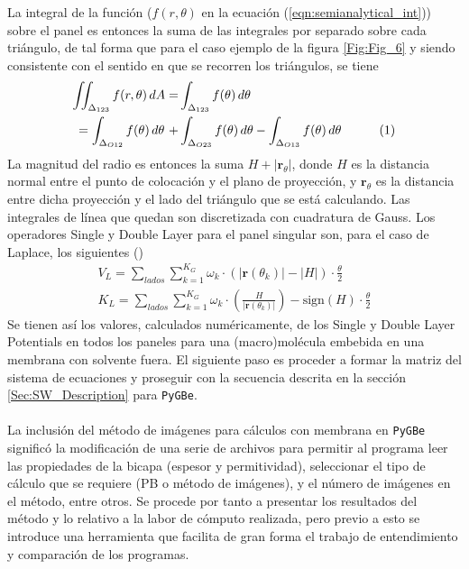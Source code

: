 \documentclass[12pt, twoside, onehalfspace, numbers, spanish]{ezthesis}
\newcommand\numberthis{\addtocounter{equation}{1}\tag{\theequation}}
\numberwithin{equation}{section}
\begin{document}
\noindent
La integral de la función ($f(r,\theta)$ en la ecuación (\ref{eqn:semianalytical_int})) sobre el panel es entonces la suma de las integrales por separado sobre cada triángulo, de tal forma que para el caso ejemplo de la figura \ref{Fig:Fig_6} y siendo consistente con el sentido en que se recorren los triángulos, se tiene
\begin{align*}
\iint_{\Delta_{123}}f(r,\theta)\, dA =& \int_{\Delta_{123}}f(\theta)\, d\theta \\
= \int_{\Delta_{O12}}f(\theta)\, d\theta\, \, + & \int_{\Delta_{O23}}f(\theta)\, d\theta - \int_{\Delta_{O13}}f(\theta)\, d\theta& \numberthis \label{eqn:semianalytical_int}
\end{align*}
La magnitud del radio es entonces la suma $H + |\mathbf{r}_\theta|$, donde $H$ es la distancia normal entre el punto de colocación y el plano de proyección, y $\mathbf{r}_\theta$ es la distancia entre dicha proyección y el lado del triángulo que se está calculando. Las integrales de línea que quedan son discretizada con cuadratura de Gauss. Los operadores Single y Double Layer para el panel singular son, para el caso de Laplace, los siguientes (\cite{Hess})
\begin{gather}
V_L = \sum_{lados}\sum_{k=1}^{K_G}\omega_k\cdot (|\mathbf{r}(\theta_k)| - |H|)\cdot\frac{\theta}{2}\\
K_L = \sum_{lados}\sum_{k=1}^{K_G}\omega_k\cdot \left(\frac{H}{|\mathbf{r}(\theta_k)|}\right) - \text{sign}(H) \cdot\frac{\theta}{2}
\end{gather}
Se tienen así los valores, calculados numéricamente, de los Single y Double Layer Potentials en todos los paneles para una (macro)molécula embebida en una membrana con solvente fuera. El siguiente paso es proceder a formar la matriz del sistema de ecuaciones y proseguir con la secuencia descrita en la sección \ref{Sec:SW_Description} para \texttt{PyGBe}.\\\\
La inclusión del método de imágenes para cálculos con membrana en \texttt{PyGBe} significó la modificación de una serie de archivos para permitir al programa leer las propiedades de la bicapa (espesor y permitividad), seleccionar el tipo de cálculo que se requiere (PB o método de imágenes), y el número de imágenes en el método, entre otros. Se procede por tanto a presentar los resultados del método y lo relativo a la labor de cómputo realizada, pero previo a esto se introduce una herramienta que facilita de gran forma el trabajo de entendimiento y comparación de los programas.
\end{document}
